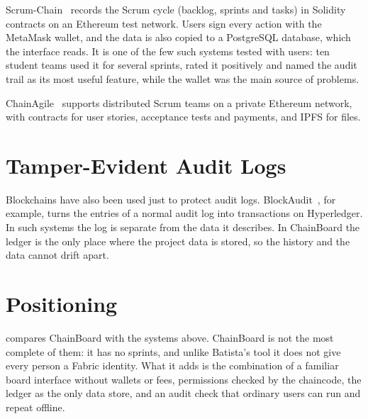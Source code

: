 Scrum-Chain~\cite{silva_scrumchain} records the Scrum cycle (backlog, sprints and tasks) in Solidity contracts on an Ethereum test network. Users sign every action with the MetaMask wallet, and the data is also copied to a PostgreSQL database, which the interface reads. It is one of the few such systems tested with users: ten student teams used it for several sprints, rated it positively and named the audit trail as its most useful feature, while the wallet was the main source of problems.

ChainAgile~\cite{qureshi2024chainagile} supports distributed Scrum teams on a private Ethereum network, with contracts for user stories, acceptance tests and payments, and IPFS for files.

\section{Tamper-Evident Audit Logs}
\label{sec:related-logging}

Blockchains have also been used just to protect audit logs. BlockAudit~\cite{ahmad2018blockaudit}, for example, turns the entries of a normal audit log into transactions on Hyperledger. In such systems the log is separate from the data it describes. In ChainBoard the ledger is the only place where the project data is stored, so the history and the data cannot drift apart.

\section{Positioning}
\label{sec:positioning}

 compares ChainBoard with the systems above. ChainBoard is not the most complete of them: it has no sprints, and unlike Batista's tool it does not give every person a Fabric identity. What it adds is the combination of a familiar board interface without wallets or fees, permissions checked by the chaincode, the ledger as the only data store, and an audit check that ordinary users can run and repeat offline.

